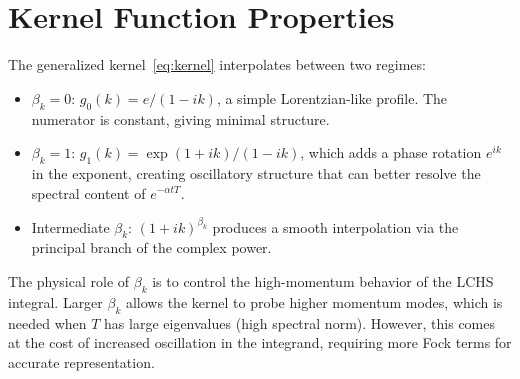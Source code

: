 \documentclass[11pt]{article}
\begin{document}
\section{Kernel Function Properties}

The generalized kernel~\eqref{eq:kernel} interpolates between two regimes:
\begin{itemize}
\item $\beta_k = 0$: $g_0(k) = e/(1-ik)$, a simple Lorentzian-like profile.
  The numerator is constant, giving minimal structure.
\item $\beta_k = 1$: $g_1(k) = \exp(1+ik)/(1-ik)$, which adds a phase rotation
  $e^{ik}$ in the exponent, creating oscillatory structure that can better resolve
  the spectral content of $e^{-\alpha t T}$.
\item Intermediate $\beta_k$: $(1+ik)^{\beta_k}$ produces a smooth interpolation
  via the principal branch of the complex power.
\end{itemize}

The physical role of $\beta_k$ is to control the high-momentum behavior of the
LCHS integral.  Larger $\beta_k$ allows the kernel to probe higher momentum modes,
which is needed when $T$ has large eigenvalues (high spectral norm).  However,
this comes at the cost of increased oscillation in the integrand, requiring more
Fock terms for accurate representation.
\end{document}
